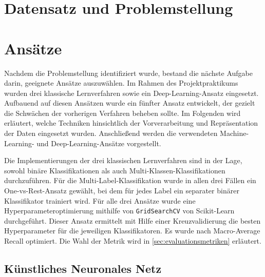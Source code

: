 \documentclass[researchlab,palatino]{AIGpaper}
\begin{document}
\section{Datensatz und Problemstellung}
\label{Datensatz}


\section{Ansätze}
\label{sec:Ansaetze}
Nachdem die Problemstellung identifiziert wurde, bestand die nächste Aufgabe darin, geeignete Ansätze auszuwählen. Im Rahmen des Projektpraktikums wurden drei klassische Lernverfahren sowie ein Deep-Learning-Ansatz eingesetzt. Aufbauend auf diesen Ansätzen wurde ein fünfter Ansatz entwickelt, der gezielt die Schwächen der vorherigen Verfahren beheben sollte. Im Folgenden wird erläutert, welche Techniken hinsichtlich der Vorverarbeitung und Repräsentation der Daten eingesetzt wurden. Anschließend werden die verwendeten Machine-Learning- und Deep-Learning-Ansätze vorgestellt.

Die Implementierungen der drei klassischen Lernverfahren sind in der Lage, sowohl binäre Klassifikationen als auch Multi-Klassen-Klassifikationen durchzuführen. Für die Multi-Label-Klassifikation wurde in allen drei Fällen ein One-vs-Rest-Ansatz gewählt, bei dem für jedes Label ein separater binärer Klassifikator trainiert wird. Für alle drei Ansätze wurde eine Hyperparameteroptimierung mithilfe von \texttt{GridSearchCV} von Scikit-Learn \cite{Pedregosa2011} durchgeführt. Dieser Ansatz ermittelt mit Hilfe einer Kreuzvalidierung die besten Hyperparameter für die jeweiligen Klassifikatoren. Es wurde nach Macro-Average Recall optimiert. Die Wahl der Metrik wird in \ref{sec:evaluationsmetriken} erläutert.









\subsection{Künstliches Neuronales Netz}
\label{KNN}

\end{document}
